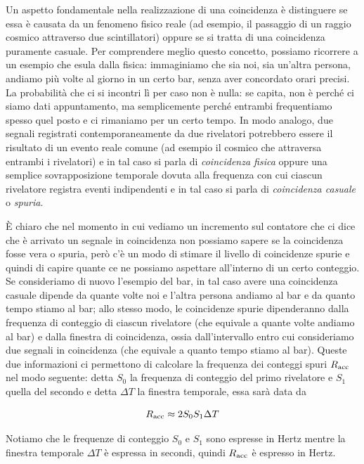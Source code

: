 Un aspetto fondamentale nella realizzazione di una coincidenza è distinguere se essa è causata da un fenomeno fisico reale (ad esempio, il passaggio di un raggio cosmico attraverso due scintillatori) oppure se si tratta di una coincidenza puramente casuale. Per comprendere meglio questo concetto, possiamo ricorrere a un esempio che esula dalla fisica: immaginiamo che sia noi, sia un'altra persona, andiamo più volte al giorno in un certo bar, senza aver concordato orari precisi. La probabilità che ci si incontri lì per caso non è nulla: se capita, non è perché ci siamo dati appuntamento, ma semplicemente perché entrambi frequentiamo spesso quel posto e ci rimaniamo per un certo tempo. In modo analogo, due segnali registrati contemporaneamente da due rivelatori potrebbero essere il risultato di un evento reale comune (ad esempio il cosmico che attraversa entrambi i rivelatori) e in tal caso si parla di \textit{coincidenza fisica} oppure una semplice sovrapposizione temporale dovuta alla frequenza con cui ciascun rivelatore registra eventi indipendenti e in tal caso si parla di \textit{coincidenza casuale} o \textit{spuria}.

È chiaro che nel momento in cui vediamo un incremento sul contatore che ci dice che è arrivato un segnale in coincidenza non possiamo sapere se la coincidenza fosse vera o spuria, però c'è un modo di stimare il livello di coincidenze spurie e quindi di capire quante ce ne possiamo aspettare all'interno di un certo conteggio. Se consideriamo di nuovo l'esempio del bar, in tal caso avere una coincidenza casuale dipende da quante volte noi e l'altra persona andiamo al bar e da quanto tempo stiamo al bar; allo stesso modo, le coincidenze spurie dipenderanno dalla frequenza di conteggio di ciascun rivelatore (che equivale a quante volte andiamo al bar) e dalla finestra di coincidenza, ossia dall'intervallo entro cui consideriamo due segnali in coincidenza (che equivale a quanto tempo stiamo al bar). Queste due informazioni ci permettono di calcolare la frequenza dei conteggi spuri $R_{\rm acc}$ nel modo seguente: detta $S_0$ la frequenza di conteggio del primo rivelatore e $S_1$ quella del secondo e detta $\Delta T$ la finestra temporale, essa sarà data da

\begin{equation*}
   R_{\rm acc} \approx 2 S_0 S_1 \Delta T
\end{equation*}

Notiamo che le frequenze di conteggio $S_0$ e $S_1$ sono espresse in Hertz mentre la finestra temporale $\Delta T$ è espressa in secondi, quindi $R_{\rm acc}$ è espresso in Hertz.

